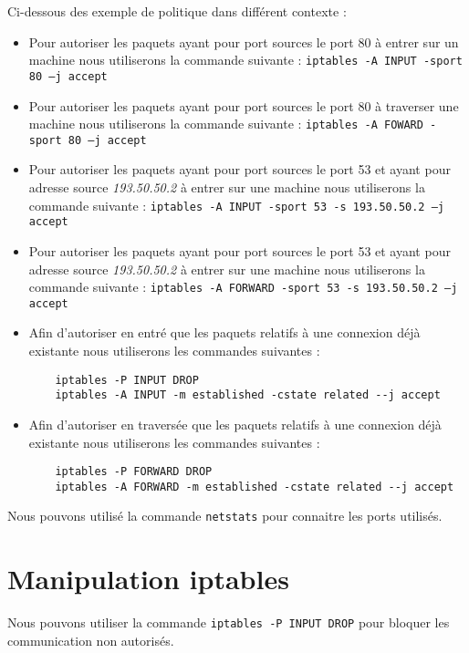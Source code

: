Ci-dessous des exemple de politique dans différent contexte :
\begin{itemize}
  \item Pour autoriser les paquets ayant pour port sources le port 80 à entrer sur un machine nous utiliserons la commande suivante : \texttt{iptables -A INPUT -sport 80 --j accept}
  \item Pour autoriser les paquets ayant pour port sources le port 80 à traverser une machine nous utiliserons la commande suivante : \texttt{iptables -A FOWARD -sport 80 --j accept}
  \item Pour autoriser les paquets ayant pour port sources le port 53 et ayant pour adresse source \textit{193.50.50.2} à entrer sur une machine nous utiliserons la commande suivante : \texttt{iptables -A INPUT -sport 53 -s 193.50.50.2 --j accept}
  \item Pour autoriser les paquets ayant pour port sources le port 53 et ayant pour adresse source \textit{193.50.50.2} à entrer sur une machine nous utiliserons la commande suivante : \texttt{iptables -A FORWARD -sport 53 -s 193.50.50.2 --j accept}
  \item Afin d'autoriser en entré que les paquets relatifs à une connexion déjà existante nous utiliserons les commandes suivantes :
  \begin{verbatim}
    iptables -P INPUT DROP
    iptables -A INPUT -m established -cstate related --j accept
  \end{verbatim}
  \item Afin d'autoriser en traversée que les paquets relatifs à une connexion déjà existante nous utiliserons les commandes suivantes :
  \begin{verbatim}
    iptables -P FORWARD DROP
    iptables -A FORWARD -m established -cstate related --j accept
  \end{verbatim}
\end{itemize}

Nous pouvons utilisé la commande \texttt{netstats} pour connaitre les ports utilisés.

\section{Manipulation iptables}
Nous pouvons utiliser la commande \texttt{iptables -P INPUT DROP} pour bloquer les communication non autorisés.

